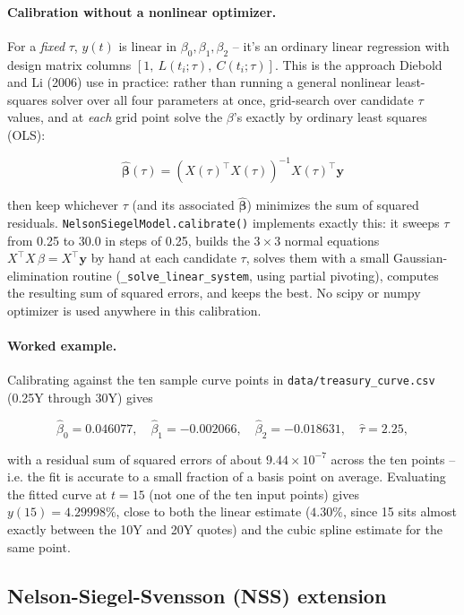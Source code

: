 \documentclass[11pt]{article}
\begin{document}
\paragraph{Calibration without a nonlinear optimizer.} For a \emph{fixed} $\tau$, $y(t)$ is
linear in $\beta_0, \beta_1, \beta_2$ -- it's an ordinary linear regression with design matrix
columns $[1,\ L(t_i;\tau),\ C(t_i;\tau)]$. This is the approach Diebold and Li (2006) use in
practice: rather than running a general nonlinear least-squares solver over all four parameters
at once, grid-search over candidate $\tau$ values, and at \emph{each} grid point solve the
$\beta$'s exactly by ordinary least squares (OLS):

\begin{equation}
  \hat{\boldsymbol\beta}(\tau) = (X(\tau)^\top X(\tau))^{-1} X(\tau)^\top \mathbf{y}
  \label{eq:ols-normal-equations}
\end{equation}

then keep whichever $\tau$ (and its associated $\hat{\boldsymbol\beta}$) minimizes the sum of
squared residuals. \texttt{NelsonSiegelModel.calibrate()} implements exactly this: it sweeps
$\tau$ from 0.25 to 30.0 in steps of 0.25, builds the $3\times 3$ normal equations
$X^\top X\, \beta = X^\top \mathbf{y}$ by hand at each candidate $\tau$, solves them with a
small Gaussian-elimination routine (\texttt{\_solve\_linear\_system}, using partial pivoting),
computes the resulting sum of squared errors, and keeps the best. No scipy or numpy optimizer
is used anywhere in this calibration.

\paragraph{Worked example.} Calibrating against the ten sample curve points in
\texttt{data/treasury\_curve.csv} (0.25Y through 30Y) gives

\[
  \hat\beta_0 = 0.046077, \quad \hat\beta_1 = -0.002066, \quad \hat\beta_2 = -0.018631, \quad
  \hat\tau = 2.25,
\]

with a residual sum of squared errors of about $9.44\times 10^{-7}$ across the ten points --
i.e. the fit is accurate to a small fraction of a basis point on average. Evaluating the fitted
curve at $t=15$ (not one of the ten input points) gives $y(15) = 4.29998\%$, close to both the
linear estimate ($4.30\%$, since 15 sits almost exactly between the 10Y and 20Y quotes) and the
cubic spline estimate for the same point.

\subsection{Nelson-Siegel-Svensson (NSS) extension}
\end{document}
